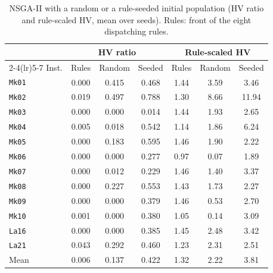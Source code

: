 \begin{table}[htbp]
\centering
\caption{NSGA-II with a random or a rule-seeded initial population (HV ratio and rule-scaled HV, mean over seeds). Rules: front of the eight dispatching rules.}
\label{tab:seeding}
\footnotesize
\setlength{\tabcolsep}{3pt}
\begin{tabular}{lcccccc}
\toprule
 & \multicolumn{3}{c}{HV ratio} & \multicolumn{3}{c}{Rule-scaled HV} \\
\cmidrule(lr){2-4}\cmidrule(lr){5-7}
Inst. & Rules & Random & Seeded & Rules & Random & Seeded \\
\midrule
\texttt{Mk01} & 0.000 & 0.415 & 0.468 & 1.44 & 3.59 & 3.46 \\
\texttt{Mk02} & 0.019 & 0.497 & 0.788 & 1.30 & 8.66 & 11.94 \\
\texttt{Mk03} & 0.000 & 0.000 & 0.014 & 1.44 & 1.93 & 2.65 \\
\texttt{Mk04} & 0.005 & 0.018 & 0.542 & 1.14 & 1.86 & 6.24 \\
\texttt{Mk05} & 0.000 & 0.183 & 0.595 & 1.46 & 1.90 & 2.22 \\
\texttt{Mk06} & 0.000 & 0.000 & 0.277 & 0.97 & 0.07 & 1.89 \\
\texttt{Mk07} & 0.000 & 0.012 & 0.229 & 1.46 & 1.40 & 3.37 \\
\texttt{Mk08} & 0.000 & 0.227 & 0.553 & 1.43 & 1.73 & 2.27 \\
\texttt{Mk09} & 0.000 & 0.000 & 0.379 & 1.46 & 0.53 & 2.70 \\
\texttt{Mk10} & 0.001 & 0.000 & 0.380 & 1.05 & 0.14 & 3.09 \\
\texttt{La16} & 0.000 & 0.000 & 0.385 & 1.45 & 2.48 & 3.42 \\
\texttt{La21} & 0.043 & 0.292 & 0.460 & 1.23 & 2.31 & 2.51 \\
\midrule
Mean & 0.006 & 0.137 & 0.422 & 1.32 & 2.22 & 3.81 \\
\bottomrule
\end{tabular}
\end{table}
